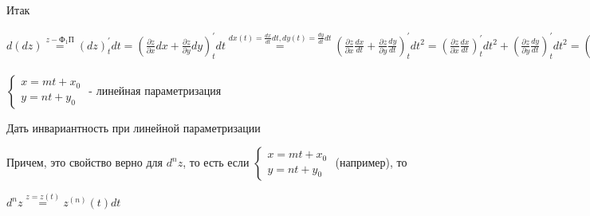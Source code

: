 \documentclass[12pt]{article}
\begin{document}
    Итак

    $\displaystyle d(dz) \stackrel{z - \text{Ф}_1\text{П}}{=} (dz)^\prime_t dt =
    \left(\frac{\partial z}{\partial x} dx + \frac{\partial z}{\partial y}dy\right)^\prime_t dt
    \stackrel{dx(t) = \frac{dx}{dt}dt, dy(t) = \frac{dy}{dt}dt}{=}
    \left(\frac{\partial z}{\partial x}\frac{dx}{dt} + \frac{\partial z}{\partial y}\frac{dy}{dt}\right)^{\prime}_t dt^2 =
    \left(\frac{\partial z}{\partial x}\frac{dx}{dt}\right)^{\prime}_t dt^2 + \left(\frac{\partial z}{\partial y}\frac{dy}{dt}\right)^{\prime}_t dt^2 =
    \left(\left(\frac{\partial z}{\partial x}\right)^{\prime}_t\frac{dx}{dt} + \frac{\partial z}{\partial x}\left(\frac{dx}{dt}\right)^{\prime}_t\right) dt^2 +
    \left(\left(\frac{\partial z}{\partial y}\right)^{\prime}_t\frac{dy}{dt} + \frac{\partial z}{\partial y}\left(\frac{dy}{dt}\right)^{\prime}_t\right) dt^2 =
    \left(\frac{\partial^2 z}{\partial x^2} \left(\frac{dx}{dt}\right)^2 + \frac{\partial z}{\partial x} \frac{d^2 x}{dt^2}\right) dt^2 +
    \left(\frac{\partial^2 z}{\partial y^2} \left(\frac{dy}{dt}\right)^2 + \frac{\partial z}{\partial y} \frac{d^2 y}{dt^2}\right) dt^2 +
    \left(\frac{\partial^2 z}{\partial x \partial y}\frac{dy}{dt}\frac{dx}{dt} + \frac{\partial^2 z}{\partial y \partial x}\frac{dx}{dt}\frac{dy}{dt}\right) dt^2 =
    \frac{\partial^2 z}{\partial x^2} dx^2 + \frac{\partial z}{\partial x} d^2 x +
    \frac{\partial^2 z}{\partial y^2} dy^2 + \frac{\partial z}{\partial y} d^2 y +
    2 \frac{\partial^2 z}{\partial x \partial y}dydx =
    \left(\frac{\partial}{\partial x} + \frac{\partial}{\partial y}\right)^2 z \frac{\partial z}{\partial x} d^2 x + \frac{\partial z}{\partial y} d^2 y
    $\displaystyle 

    $\displaystyle \begin{cases}
        x = mt + x_0 \\
         y = nt + y_0
    \end{cases}$ - линейная параметризация

    \Lab Дать инвариантность при линейной параметризации

    Причем, это свойство верно для $\displaystyle d^n z$, то есть если $\displaystyle \begin{cases}
        x = mt + x_0 \\
         y = nt + y_0
    \end{cases}$ (например), то

    $\displaystyle d^n z \stackrel{z = z(t)}{=} z^{(n)}(t)dt$

    \vspace{8mm}
    
\end{document}
